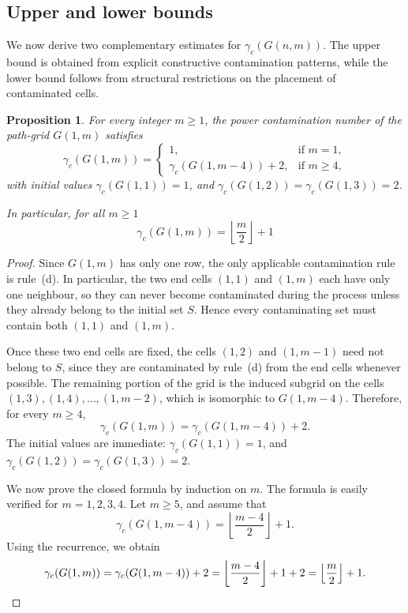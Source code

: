 \documentclass[letterpaper,12pt]{article}
\newtheorem{proposition}{Proposition}
\begin{document}
 \subsection{Upper and lower bounds}
We now derive two complementary estimates for \(\gamma_c(G(n,m))\). The upper bound is obtained from explicit constructive contamination patterns, while the lower bound follows from structural restrictions on the placement of contaminated cells.



\begin{proposition}\label{prop:path-contamination-number}
For every integer $m\ge 1$, the power contamination number of the path-grid $G(1,m)$ satisfies
\begin{equation}
    \gamma_c(G(1,m))=
\begin{cases}
1, & \text{if } m=1,\\[2mm]
\gamma_c(G(1,m-4))+2, & \text{if } m\ge 4,
\end{cases}
\end{equation}
with initial values $\gamma_c(G(1,1))=1$, and  $\gamma_c(G(1,2))=\gamma_c(G(1,3))=2$.

In particular, for all $m\geq 1$
\begin{equation}
    \gamma_c(G(1,m))=\left\lfloor \frac{m}{2}\right\rfloor+1
\end{equation}
\end{proposition}

\begin{proof}
Since $G(1,m)$ has only one row, the only applicable contamination rule is rule~(d).
In particular, the two end cells $(1,1)$ and $(1,m)$ each have only one neighbour, so they can
never become contaminated during the process unless they already belong to the initial set $S$.
Hence every contaminating set must contain both $(1,1)$ and $(1,m)$.

Once these two end cells are fixed, the cells $(1,2)$ and $(1,m-1)$ need not belong to $S$,
since they are contaminated by rule~(d) from the end cells whenever possible. The remaining
portion of the grid is the induced subgrid on the cells $(1,3),(1,4),\dots,(1,m-2)$,  which is isomorphic to $G(1,m-4)$. Therefore, for every $m\ge 4$,
\[
\gamma_c(G(1,m))=\gamma_c(G(1,m-4))+2.
\]
The initial values are immediate: $\gamma_c(G(1,1))=1$, and $\gamma_c(G(1,2))=\gamma_c(G(1,3))=2$.

We now prove the closed formula by induction on $m$.
The formula is easily verified for $m=1,2,3,4$. Let $m\ge 5$, and assume that
\[
\gamma_c(G(1,m-4))=\left\lfloor\frac{m-4}{2}\right\rfloor+1.
\]
Using the recurrence, we obtain
\[
\gamma_c(G(1,m))
=\gamma_c(G(1,m-4))+2
=\left\lfloor\frac{m-4}{2}\right\rfloor+1+2
=\left\lfloor\frac{m}{2}\right\rfloor+1.\qedhere
\]
\end{proof}
\end{document}
